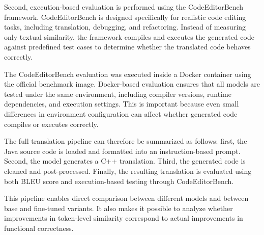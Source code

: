 Second, execution-based evaluation is performed using the CodeEditorBench
framework. CodeEditorBench is designed specifically for realistic code editing
tasks, including translation, debugging, and refactoring. %
Instead of measuring only textual similarity, the framework compiles and
executes the generated code against predefined test cases to determine whether
the translated code behaves correctly.

The CodeEditorBench evaluation was executed inside a Docker container using the
official benchmark image. Docker-based evaluation ensures that all models are
tested under the same environment, including compiler versions, runtime
dependencies, and execution settings. %
This is important because even small differences in environment configuration
can affect whether generated code compiles or executes correctly.

The full translation pipeline can therefore be summarized as follows: first, the %
Java source code is loaded and formatted into an instruction-based prompt.
Second, the model generates a C++ translation. Third, the generated code is
cleaned and post-processed. Finally, the resulting translation is evaluated
using both BLEU score and execution-based testing through CodeEditorBench.

This pipeline enables direct comparison between different models and between
base and fine-tuned variants. It also makes it possible to analyze whether
improvements in token-level similarity correspond to actual improvements in
functional correctness. %